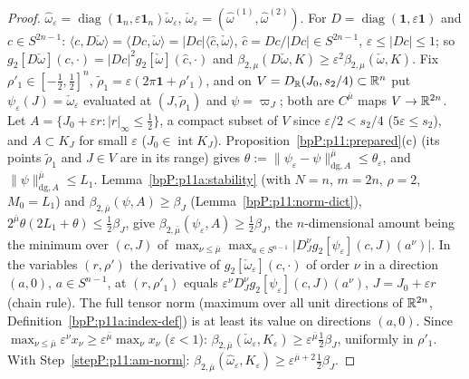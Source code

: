 \begin{proof}
\label{stepP:p11:am-norm} $\hat\omega_\varepsilon=\operatorname{diag}(\mathbf1_n,\varepsilon\mathbf1_n)\check\omega_\varepsilon$, $\check\omega_\varepsilon=(\hat\omega^{(1)},\hat\omega^{(2)})$. For $D=\operatorname{diag}(\mathbf1,\varepsilon\mathbf1)$ and $c\in S^{2n-1}$: $\langle c,D\check\omega\rangle=\langle Dc,\check\omega\rangle=\lvert Dc\rvert\langle\hat c,\check\omega\rangle$, $\hat c=Dc/\lvert Dc\rvert\in S^{2n-1}$, $\varepsilon\le\lvert Dc\rvert\le1$; so $g_2[D\check\omega](c,\cdot)=\lvert Dc\rvert^2g_2[\check\omega](\hat c,\cdot)$ and $\beta_{2,\mu}(D\check\omega,K)\ge\varepsilon^2\beta_{2,\mu}(\check\omega,K)$.
\label{stepP:p11:am-dir} Fix $\rho'_1\in[-\frac12,\frac12]^n$, $\tilde\rho_1=\varepsilon(2\pi\mathbf1+\rho'_1)$, and on $V=D_{\mathbb{R}}(J_0,s_2/4)\subset\mathbb{R}^n$ put $\psi_\varepsilon(J)=\check\omega_\varepsilon$ evaluated at $(J,\tilde\rho_1)$ and $\psi=\varpi_J$; both are $C^{\bar\mu}$ maps $V\to\mathbb{R}^{2n}$. Let $A=\{J_0+\varepsilon r:\lvert r\rvert_\infty\le\frac12\}$, a compact subset of $V$ since $\varepsilon/2<s_2/4$ ($5\varepsilon\le s_2$), and $A\subset K_J$ for small $\varepsilon$ ($J_0\in\operatorname{int}K_J$). Proposition~\ref{bpP:p11:prepared}(c) (its points $\tilde\rho_1$ and $J\in V$ are in its range) gives $\theta:=\lVert\psi_\varepsilon-\psi\rVert^{\bar\mu}_{\mathrm{dg},A}\le\theta_\varepsilon$, and $\lVert\psi\rVert^{\bar\mu}_{\mathrm{dg},A}\le L_1$. Lemma~\ref{bpP:p11a:stability} (with $N=n$, $m=2n$, $\rho=2$, $M_0=L_1$) and $\beta_{2,\bar\mu}(\psi,A)\ge\beta_J$ (Lemma~\ref{bpP:p11:norm-dict}), $2^{\bar\mu}\theta(2L_1+\theta)\le\frac12\beta_J$, give $\beta_{2,\bar\mu}(\psi_\varepsilon,A)\ge\frac12\beta_J$, the $n$-dimensional amount being the minimum over $(c,J)$ of $\max_{\nu\le\bar\mu}\max_{a\in S^{n-1}}\lvert D_J^\nu g_2[\psi_\varepsilon](c,J)(a^\nu)\rvert$.
\label{stepP:p11:am-scale} In the variables $(r,\rho')$ the derivative of $g_2[\check\omega_\varepsilon](c,\cdot)$ of order $\nu$ in a direction $(a,0)$, $a\in S^{n-1}$, at $(r,\rho'_1)$ equals $\varepsilon^\nu D_J^\nu g_2[\psi_\varepsilon](c,J)(a^\nu)$, $J=J_0+\varepsilon r$ (chain rule). The full tensor norm (maximum over all unit directions of $\mathbb{R}^{2n}$, Definition~\ref{bpP:p11a:index-def}) is at least its value on directions $(a,0)$. Since $\max_{\nu\le\bar\mu}\varepsilon^\nu x_\nu\ge\varepsilon^{\bar\mu}\max_\nu x_\nu$ ($\varepsilon<1$): $\beta_{2,\bar\mu}(\check\omega_\varepsilon,K_\varepsilon)\ge\varepsilon^{\bar\mu}\frac12\beta_J$, uniformly in $\rho'_1$. With Step~\ref{stepP:p11:am-norm}: $\beta_{2,\bar\mu}(\hat\omega_\varepsilon,K_\varepsilon)\ge\varepsilon^{\bar\mu+2}\frac12\beta_J$.
\end{proof}

